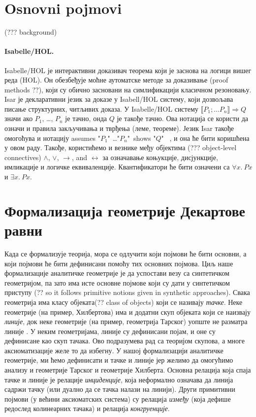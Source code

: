 \documentclass[a4paper, 12pt]{article}
\begin{document}
\section{Osnovni pojmovi} (??? {\lat background})
\label{sec:background}
{\lat \paragraph{ Isabelle/HOL.}}  {\lat Isabelle/HOL} је интерактивни
доказивач теорема који је заснова на логици вишег реда ({\lat HOL}).
Он обезбеђује моћне аутоматске методе за доказивање (proof methods
??), који су обично засновани на симлификацији класичном
резоновању. {\lat Isar} је декларативни језик за доказе у {\lat
  Isabell/HOL} систему, који дозвољава писање структурних, читљивих
доказа. У {\lat Isabelle/HOL} систему $\llbracket P_1; \ldots P_n
\rrbracket \Longrightarrow Q$ значи ако $P_1$, \ldots, $P_n$ је тачно,
онда $Q$ је такође тачно. Ова нотација се користи да означи и правила
закључивања и тврђења (леме, теореме).  Језик {\lat Isar} такође
омогоћува и нотацију {\lattt assumes "$P_1$" \ldots "$P_n$"\ shows
  "$Q$"\ } , и она ће бити коришћена у овом раду. Такође, користићемо
и везнике међу објектима (??? {\lat object-level connectives})
$\wedge$, $\vee$, $\longrightarrow$, and $\longleftrightarrow$ за
означавање коњукције, дисјункције, имликације и логичке
еквиваленције. Квантификатори ће бити означени са $\forall x.\ P x$ и
$\exists x.\ P x$.

\section{Формализација геометрије Декартове равни}
\label{sec:cartesian}

Када се формализује теорија, мора се одлучити који појмови ће бити
основни, а који појмови ће бити дефинисани помоћу тих основних
појмова. Циљ наше формализације аналитичке геометрије је да успостави
везу са синтетичком геометријом, па зато има исте основне појмове који
су дати у синтетичком приступу (?? {\lat so it follows primitive
  notions given in synthetic approaches}). Свака геометрија има класу
објеката(?? {\lat class of objects}) који се називају
\emph{тачке}. Неке геометрије (на пример, Хилбертова) има и додатни
скуп објеката који се наизвају \emph{линије}, док неке геометрије (на
пример, геометрија Тарског) уопште не разматра линије .  У неким
геометријама, линије су дефинисани појам, и оне су дефинисане као скуп
тачака.  Ово подразумева рад са теоријом скупова, а многе
аксиоматизације желе то да избегну.  У нашој формализацији аналитичке
геометрије, ми ћемо дефинисати и тачке и линије јер желимо да
омогућимо анализу и геометрије Тарског и геометрије Хилберта. Основна
релација која спаја тачке и линије је релације \emph{инциденције},
која неформално означава да линија садржи тачку (или дуално да се
тачка налази на линији). Други примитивни појмови (у већини
аксиоматских система) су релација \emph{између} (која дефише редослед
колинеарних тачака) и релација \emph{конгруенције}.
\end{document}
